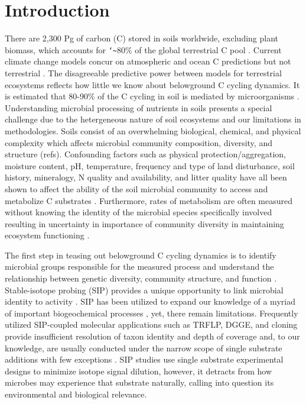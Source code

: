 \section{Introduction}
 
There are 2,300 Pg of carbon (C) stored in soils worldwide, excluding plant biomass, which accounts for \texttt{\char`\~}80\% of the global terrestrial C pool \cite{Amundson_2001,Mendelsohn_2001,IPCC2007Synth,elsen_Ayres_Wall_Bardgett_2011,Lal_2008,BATJES_1996,Lal_2008}. Current climate change models concur on atmospheric and ocean C predictions but not terrestrial \cite{Friedlingstein_2006}.  The disagreeable predictive power between models for terrestrial ecosystems reflects how little we know about belowground C cycling dynamics. It is estimated that 80-90\% of the C cycling in soil is mediated by microorganisms \cite{ColemanCrossley_1996,Nannipieri_2003}. Understanding microbial processing of nutrients in soils presents a special challenge due to the hetergeneous nature of soil ecosystems and our limitations in methodologies. Soils consist of an overwhelming biological, chemical, and physical complexity which affects microbial community composition, diversity, and structure (refs).  Confounding factors such as physical protection/aggregation, moisture content, pH, temperature, frequency and type of land disturbance, soil history, mineralogy, N quality and availability, and litter quality have all been shown to affect the ability of the soil microbial community to access and metabolize C substrates \cite{Schlesinger_1977,dgett_Wall_Hattenschwiler_2010,Sollins_Homann_Caldwell_1996,Torn_Vitousek_Trumbore_2005,TRUMBORE_2006,Schimel_2012}. Furthermore, rates of metabolism are often measured without knowing the identity of the microbial species specifically involved \cite{ndi_Pietramellara_Renella_2003} resulting in uncertainty in importance of community diversity in maintaining ecosystem functioning \cite{Allison_2008,ndi_Pietramellara_Renella_2003,Schimel_2012}. 

The first step in teasing out belowground C cycling dynamics is to identify microbial groups responsible for the measured process and understand the relationship between genetic diversity, community structure, and function \cite{O_Donnell_2002}. Stable-isotope probing (SIP) provides a unique opportunity to link microbial identity to activity \cite{Chen_Murrell_2010}. SIP has been utilized to expand our knowledge of a myriad of important biogeochemical processes \cite{Chen_Murrell_2010}, yet, there remain limitations. Frequently utilized SIP-coupled molecular applications such as TRFLP, DGGE, and cloning provide insufficient resolution of taxon identity and depth of coverage and, to our knowledge, are usually conducted under the narrow scope of single substrate additions with few exceptions \cite{Lueders_2003,Chauhan_2009}. SIP studies use single substrate experimental designs to minimize isotope signal dilution, however, it detracts from how microbes may experience that substrate naturally, calling into question its environmental and biological relevance.

